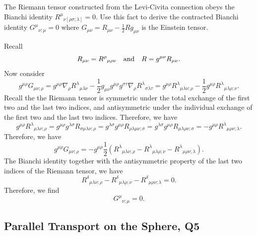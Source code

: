 The Riemann tensor constructed from the Levi-Civita connection obeys the Bianchi identity $R^\mu{}_{\nu[\rho\sigma;\lambda]} = 0$. Use this fact to derive the contracted Bianchi identity $G^\mu{}_{\nu;\mu} = 0$ where $G_{\mu\nu} = R_{\mu\nu} - \frac{1}{2}Rg_{\mu\nu}$ is the Einstein tensor.
\begin{solution}
    Recall
    \begin{equation}
        R_{\mu\nu} = R^\rho{}_{\mu\rho\nu} \quad {\rm{and}} \quad R = g^{\mu\nu}R_{\mu\nu}.
    \end{equation}
    Now consider
    \begin{equation}
        g^{\mu\rho}G_{\mu\nu;\rho} = g^{\mu\rho}\nabla_\rho R^\lambda{}_{\mu\lambda\nu} - \frac{1}{2}g_{\mu\nu}g^{\mu\rho}g^{\sigma\tau}\nabla_\rho R^\lambda{}_{\sigma\lambda\tau} = g^{\mu\rho} R^\lambda{}_{\mu\lambda\nu;\rho} - \frac{1}{2}g^{\mu\rho} R^\lambda{}_{\mu\lambda\rho;\nu}.
    \end{equation}
    Recall the the Riemann tensor is symmetric under the total exchange of the first two and the last two indices, and antisymmetric under the individual exchange of the first two and the last two indices. Therefore, we have
    \begin{equation}
        g^{\mu\rho}R^\lambda{}_{\mu\lambda\nu;\rho} = g^{\mu\rho}g^{\lambda\sigma}R_{\sigma\mu\lambda\nu;\rho}  = g^{\lambda\sigma}g^{\mu\rho}R_{\rho\lambda\mu\nu;\sigma} = g^{\lambda\sigma}g^{\mu\rho}R_{\mu\lambda\rho\nu;\sigma} = - g^{\mu\rho}R^\lambda{}_{\mu\rho\nu;\lambda}.
    \end{equation}
    Therefore, we have
    \begin{equation}
        g^{\mu\rho}G_{\mu\nu;\rho} = - g^{\mu\rho}\frac{1}{2}(R^\lambda{}_{\mu\lambda\nu;\rho}-R^\lambda{}_{\mu\lambda\rho;\nu}- R^\lambda{}_{\mu\rho\nu;\lambda}).
    \end{equation}
    The Bianchi identity together with the antisymmetric property of the last two indices of the Riemann tensor, we have
    \begin{equation}
        R^\delta{}_{\mu\lambda\nu;\rho}-R^\delta{}_{\mu\lambda\rho;\nu}- R^\delta{}_{\mu\rho\nu;\lambda}=0.
    \end{equation}
    Therefore, we find
    \begin{equation}
        G^\mu{}_{\nu;\mu} = 0.
    \end{equation}
\end{solution}

\subsection{Parallel Transport on the Sphere, Q5}

